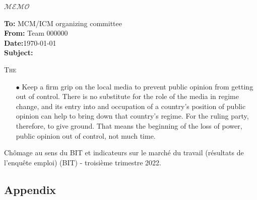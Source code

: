 \documentclass[12pt]{article}  %
\begin{document}
\begin{letter}{\huge{$\mathscr{MEMO}$}}
\begin{flushleft}  %
\textbf{To:} MCM/ICM organizing committee\\
\textbf{From:} Team 000000\\
\textbf{Date:}\today\\
\textbf{Subject:} 
\end{flushleft}
\lettrine{T}{he}
{\itshape \begin{enumerate}[0]
    \item[$\bullet$] Keep a firm grip on the local media to prevent public opinion from getting out of control. There is no substitute for the role of the media in regime change, and its entry into and occupation of a country's position of public opinion can help to bring down that country's regime. For the ruling party, therefore, to give ground. That means the beginning of the loss of power, public opinion out of control, not much time.
\end{enumerate}}
\end{letter}



















\newpage
\begin{thebibliography}{100}

Chômage au sens du {BIT} et indicateurs sur le marché du travail (résultats
  de l’enquête emploi) ({BIT}) - troisième trimestre 2022.
\end{thebibliography}



\begin{subappendices}  %
\section{Appendix}


\end{subappendices}  %
\end{document}
